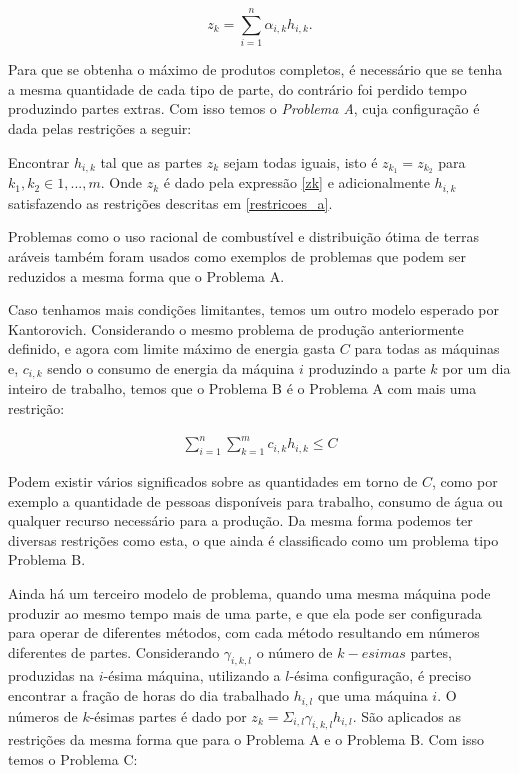 \begin{equation}
  z_k = \sum_{i=1}^n \alpha_{i, k} h_{i, k}.
  \label{zk}
\end{equation}


\par Para que se obtenha o máximo de produtos completos, é necessário que se tenha a mesma quantidade de
cada tipo de parte, do contrário foi perdido tempo produzindo partes extras. Com isso temos o
\textit{Problema A}, cuja configuração é dada pelas restrições a seguir:

\begin{center}
  Encontrar \(h_{i, k}\) tal que as partes \(z_k\) sejam todas iguais, isto é \(z_{k_1} = z_{k_2} \)
  para \(k_1, k_2 \in {1, ..., m}\). Onde \(z_k\) é dado pela expressão \ref{zk} e adicionalmente
  \(h_{i, k}\) satisfazendo as restrições descritas em \ref{restricoes_a}.
\end{center}

Problemas como o uso racional de combustível e distribuição ótima de terras aráveis
também foram usados como exemplos de problemas que podem ser reduzidos a mesma forma
que o Problema A.

Caso tenhamos mais condições limitantes, temos um outro modelo esperado por Kantorovich.
Considerando o mesmo problema de produção anteriormente definido, e agora com limite
máximo de energia gasta \(C\) para todas as máquinas e, \(c_{i, k}\) sendo o consumo de energia
da máquina \(i\) produzindo a parte \(k\) por um dia inteiro de trabalho, temos que o
Problema B é o Problema A com mais uma restrição:

\begin{align}
  \sum_{i=1}^n \sum_{k=1}^m c_{i, k} h_{i, k} \leq C
\end{align}

Podem existir vários significados sobre as quantidades em torno de \(C\), como por exemplo
a quantidade de pessoas disponíveis para trabalho, consumo de água ou qualquer recurso
necessário para a produção. Da mesma forma podemos ter diversas restrições como esta,
o que ainda é classificado como um problema tipo Problema B.

Ainda há um terceiro modelo de problema, quando uma mesma máquina pode produzir ao mesmo tempo
mais de uma parte, e que ela pode ser configurada para operar de diferentes métodos, com cada
método resultando em números diferentes de partes. Considerando \( \gamma_{i, k, l} \) o número de
\(k-esimas\) partes, produzidas na \(i\)-ésima máquina, utilizando a \(l\)-ésima configuração,
é preciso encontrar a fração de horas do dia trabalhado \(h_{i, l}\) que uma máquina \(i\).
O números de \(k\)-ésimas partes é dado por \( z_k = \Sigma_{i, l} \gamma_{i, k, l} h_{i, l}\). São aplicados as
restrições da mesma forma que para o Problema A e o Problema B. Com isso temos o Problema C:

